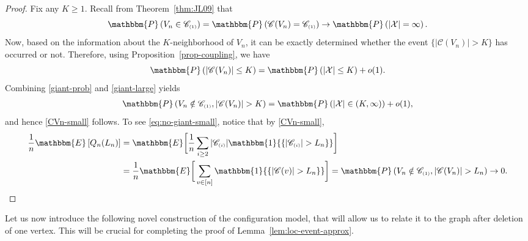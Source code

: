 \documentclass[11pt,a4paper, reqno]{article}
\numberwithin{equation}{section}
\numberwithin{equation}{section}
\def\sss{\scriptscriptstyle}
\newcommand{\prob}[1]{\ensuremath{\mathbbm{P}\left(#1\right)}}
\newcommand{\expt}[1]{\ensuremath{\mathbbm{E}\left[#1\right]}}
\newcommand{\ind}[1]{\ensuremath{\mathbbm{1}{\left\{#1\right\}}}}
\newcommand{\E}{\ensuremath{\mathbbm{E}}}
\newcommand{\1}{\ensuremath{\mathbbm{1}}}
\newcommand{\C}{\mathscr{C}_{\sss (1)}}
\numberwithin{equation}{section}
\numberwithin{theorem}{section}
\begin{document}
\begin{proof}
Fix any $K\geq 1$. Recall from Theorem~\ref{thm:JL09} that 
\begin{equation}\label{giant-prob}
 \prob{V_n\in \C} =\prob{\mathscr{C}(V_n)=\C}\to \prob{|\mathcal{X}|=\infty}.
\end{equation} 
Now, based on the information about the $K$-neighborhood of $V_n$, it can be exactly determined whether the event $\{|\mathscr{C}(V_n)|>K\}$ has occurred or not.
Therefore, using Proposition~\ref{prop-coupling}, we have
\begin{equation}\label{giant-large}
 \prob{|\mathscr{C}(V_n)|\leq K} = \prob{|\mathcal{X}|\leq K}+o(1).
\end{equation} 
Combining \eqref{giant-prob} and \eqref{giant-large} yields
\begin{equation}
\begin{split}
 \prob{V_n\notin \C, |\mathscr{C}(V_n)|>K}
 =\prob{|\mathcal{X}|\in (K,\infty)}+o(1),
 \end{split}
\end{equation}
and hence \eqref{CVn-small} follows. To see \eqref{eq:no-giant-small}, notice that by \eqref{CVn-small},
\begin{equation*}
 \begin{split}
 \frac{1}{n} \expt{Q_n(L_n)}&=\E\bigg[\frac{1}{n}\sum_{i\geq 2}|\mathscr{C}_{\sss (i)}|\ind{|\mathscr{C}_{\sss (i)} |> L_n}\bigg]\\
 &=\frac{1}{n}\E\bigg[\sum_{v\in [n] }\ind{|\mathscr{C}(v) |> L_n}\bigg]=\prob{V_n\notin\C,|\mathscr{C}(V_n)|>L_n}\to 0.
 \end{split}
\end{equation*}
\end{proof}
Let us now introduce the following novel construction of the configuration model, that will allow us to relate it to the graph after deletion of one vertex. 
This will be crucial for completing the proof of Lemma~\ref{lem:loc-event-approx}. 
\end{document}
